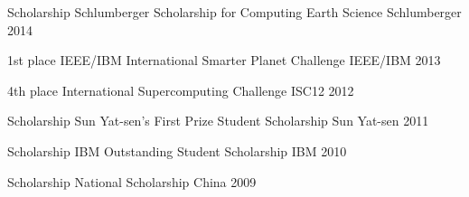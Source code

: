 \documentclass[11pt, a4paper]{awesome-cv}
\begin{document}
\begin{cvhonors}

  \cvhonor
    {Scholarship} %
    {Schlumberger Scholarship for Computing Earth Science} %
    {Schlumberger} %
    {2014} %

  \cvhonor
    {1st place} %
    {IEEE/IBM International Smarter Planet Challenge} %
    {IEEE/IBM}
    {2013} %

  \cvhonor
    {4th place} %
    {International Supercomputing Challenge} %
    {ISC12} %
    {2012} %

  \cvhonor
    {Scholarship} %
    {Sun Yat-sen’s First Prize Student Scholarship} %
    {Sun Yat-sen} %
    {2011} %

  \cvhonor
    {Scholarship} %
    {IBM Outstanding Student Scholarship} %
    {IBM} %
    {2010} %

  \cvhonor
    {Scholarship} %
    {National Scholarship} %
    {China} %
    {2009} %
\end{cvhonors}

\end{document}
